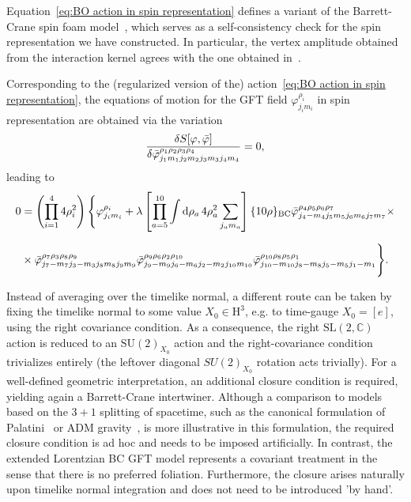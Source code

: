 \documentclass[11pt,a4paper]{article}
\newcommand{\C}{\mathbb C}
\newcommand{\SU}{\text{SU$(2)$}}
\newcommand{\SL}{\text{SL$(2,\C)$}}
\newcommand{\HH}{\text{H}^3}
\begin{document}
Equation~\eqref{eq:BO action in spin representation} defines a variant of the Barrett-Crane spin foam model~\cite{Perez:2000ec,Oriti:2003wf,Barrett:1999qw}, which serves as a self-consistency check for the spin representation we have constructed. In particular, the vertex amplitude obtained from the interaction kernel agrees with the one obtained in~\cite{Perez:2000ec}.

Corresponding to the (regularized version of the) action~\eqref{eq:BO action in spin representation}, the equations of motion for the GFT field $\varphi^{\rho_i}_{j_i m_i}$ in spin representation are obtained via the variation
%
\begin{equation}
\fdv{S[\varphi,\bar{\varphi}]}{\bar{\varphi}^{\rho_1 \rho_2\rho_3\rho_4}_{j_1 m_1 j_2 m_2 j_3 m_3 j_4 m_4}} = 0,
\end{equation}
%
leading to
%
\begin{equation}
\begin{aligned}
0 & = \left(\prod_{i=1}^44\rho_i^2\right)\Bigg{\{}\varphi^{\rho_i}_{j_i m_i}+\lambda\left[\prod_{a=5}^{10}\int\dd{\rho_a}4\rho_a^2\sum_{j_a m_a}\right]\{10\rho\}_{\text{BC}}\bar{\varphi}^{\rho_4 \rho_5 \rho_6 \rho_7}_{j_4 -m_4 j_5 m_5 j_6 m_6 j_7 m_7}\times\\[7pt]
& \times
\bar{\varphi}^{\rho_7 \rho_3 \rho_8 \rho_9}_{j_7 -m_7 j_3 -m_3 j_8 m_8 j_9 m_9}\bar{\varphi}^{\rho_9 \rho_6 \rho_2 \rho_{10}}_{j_9 -m_9 j_6 -m_6 j_2 -m_2 j_{10} m_{10}}\bar{\varphi}^{\rho_{10} \rho_8 \rho_5 \rho_1}_{j_{10} -m_{10} j_8 -m_8 j_5 -m_5 j_1 -m_1}\Bigg{\}}.
\end{aligned}
\end{equation}
%


Instead of averaging over the timelike normal, a different route can be taken by fixing the timelike normal to some value $X_0\in\HH$, e.g. to time-gauge $X_0 = [e]$, using the right covariance condition. As a consequence, the right $\SL$ action is reduced to an $\SU_{X_0}$ action and the right-covariance condition trivializes entirely (the leftover diagonal $SU(2)_{X_0}$ rotation acts trivially). For a well-defined geometric interpretation, an additional closure condition is required, yielding again a Barrett-Crane intertwiner. Although a comparison to models based on the $3+1$ splitting of spacetime, such as the canonical formulation of Palatini~\cite{Ashtekar1991} or ADM gravity~\cite{Thiemann:2007pyv}, is more illustrative in this formulation, the required closure condition is ad hoc and needs to be imposed artificially. In contrast, the extended Lorentzian BC GFT model represents a covariant treatment in the sense that there is no preferred foliation. Furthermore, the closure arises naturally upon timelike normal integration and does not need to be introduced 'by hand'.
\end{document}
